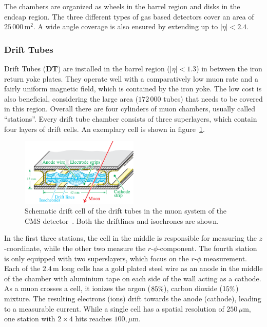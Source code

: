 The chambers are organized as wheels in the barrel region and disks in the endcap region. The three different types of gas based detectors cover an area of $25\,000\,\text{m}^2$. A wide angle coverage is also ensured by extending up to $|\eta| < 2.4$.

\subsubsection{Drift Tubes}
\label{sec:drift-tubes}

Drift Tubes (\textbf{DT}) are installed in the barrel region ($|\eta| < 1.3$) in between the iron return yoke plates. They operate well with a comparatively low muon rate and a fairly uniform magnetic field, which is contained by the iron yoke. The low cost is also beneficial, considering the large area ($172\,000$ tubes) that needs to be covered in this region. Overall there are four cylinders of muon chambers, usually called ``stations''. Every drift tube chamber consists of three superlayers, which contain four layers of drift cells. An exemplary cell is shown in figure~\ref{fig:drift-cell}.

\begin{figure}[!htb]
  \centering
  \includegraphics[width=0.5\textwidth]{plots/driftcell.pdf}  
  \caption{Schematic drift cell of the drift tubes in the muon system of the CMS detector~\cite{driftcell}. Both the driftlines and isochrones are shown.}
  \label{fig:drift-cell}
\end{figure}

In the first three stations, the cell in the middle is responsible for measuring the $z$-coordinate, while the other two measure the $r$-$\phi$-component. The fourth station is only equipped with two superslayers, which focus on the $r$-$\phi$ measurement. Each of the $2.4\,\text{m}$ long cells has a gold plated steel wire as an anode in the middle of the chamber with aluminium tape on each side of the wall acting as a cathode. As a muon crosses a cell, it ionizes the argon ($85\pct$), carbon dioxide ($15\pct$) mixture. The resulting electrons (ions) drift towards the anode (cathode), leading to a measurable current. While a single cell has a spatial resolution of $250\,\mu\text{m}$, one station with $2 \times 4$ hits reaches $100,\mu\text{m}$.

